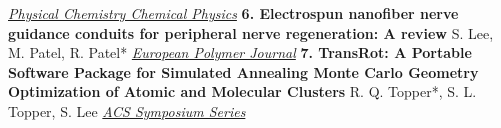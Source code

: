 \documentclass{article}%
\begin{document}
%
\href{https://doi.org/10.1021/acsami.4c19149}{\textit{Physical Chemistry Chemical Physics}}%
\newline%
\newline%
%
\textbf{6. Electrospun nanofiber nerve guidance conduits for peripheral nerve regeneration: A review\newline%
}%
S. Lee, M. Patel, R. Patel*\newline%
%
\href{https://doi.org/10.1016/j.eurpolymj.2022.111663}{\textit{European Polymer Journal}}%
\newline%
\newline%
%
\textbf{7. TransRot: A Portable Software Package for Simulated Annealing Monte Carlo Geometry Optimization of Atomic and Molecular Clusters\newline%
}%
R. Q. Topper*, S. L. Topper, S. Lee\newline%
%
\href{https://doi.org/10.1021/bk-2022-1428.ch002}{\textit{ACS Symposium Series}}%

%
\end{document}
